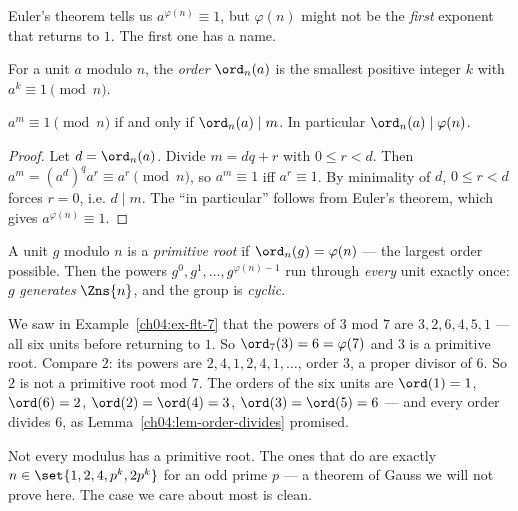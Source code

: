 Euler's theorem tells us $a^{\varphi(n)} \equiv 1$, but $\varphi(n)$ might not be the \emph{first}
exponent that returns to $1$. The first one has a name.

\begin{definition}
\label{ch04:def-order}
For a unit $a$ modulo $n$, the \emph{order} $\ord_n(a)$ is the smallest positive integer $k$ with
$a^k \equiv 1 \pmod n$.
\end{definition}

\begin{lemma}
\label{ch04:lem-order-divides}
$a^m \equiv 1 \pmod n$ if and only if $\ord_n(a) \mid m$. In particular $\ord_n(a) \mid \varphi(n)$.
\end{lemma}

\begin{proof}
Let $d = \ord_n(a)$. Divide $m = dq + r$ with $0 \le r < d$. Then
$a^m = (a^d)^q a^r \equiv a^r \pmod n$, so $a^m \equiv 1$ iff $a^r \equiv 1$. By minimality of $d$,
$0 \le r < d$ forces $r = 0$, i.e. $d \mid m$. The ``in particular'' follows from Euler's theorem,
which gives $a^{\varphi(n)} \equiv 1$.
\end{proof}

\begin{definition}
\label{ch04:def-primroot}
A unit $g$ modulo $n$ is a \emph{primitive root} if $\ord_n(g) = \varphi(n)$ --- the largest order
possible. Then the powers $g^0, g^1, \dots, g^{\varphi(n)-1}$ run through \emph{every} unit exactly
once: $g$ \emph{generates} $\Zns{n}$, and the group is \emph{cyclic}.
\end{definition}

\begin{example}
\label{ch04:ex-primroot-7}
We saw in Example~\ref{ch04:ex-flt-7} that the powers of $3$ mod $7$ are
$3, 2, 6, 4, 5, 1$ --- all six units before returning to $1$. So $\ord_7(3) = 6 = \varphi(7)$ and
$3$ is a primitive root. Compare $2$: its powers are $2, 4, 1, 2, 4, 1, \dots$, order $3$, a proper
divisor of $6$. So $2$ is not a primitive root mod $7$. The orders of the six units are
$\ord(1)=1$, $\ord(6)=2$, $\ord(2)=\ord(4)=3$, $\ord(3)=\ord(5)=6$ --- and every order divides $6$,
as Lemma~\ref{ch04:lem-order-divides} promised.
\end{example}

Not every modulus has a primitive root. The ones that do are exactly $n \in \set{1, 2, 4, p^k,
2p^k}$ for an odd prime $p$ --- a theorem of Gauss we will not prove here. The case we care about
most is clean.

